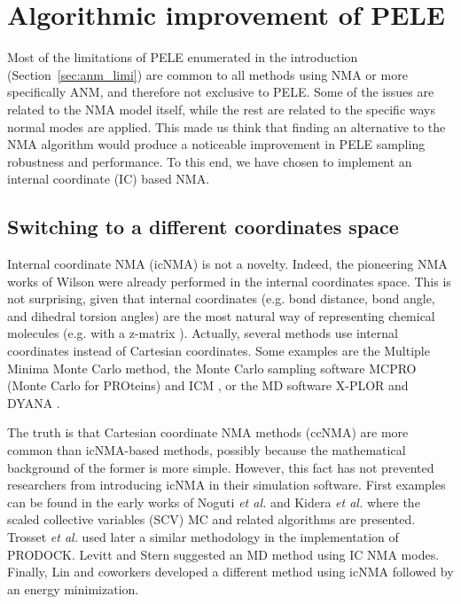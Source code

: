 \section{Algorithmic improvement of PELE}

Most of the limitations of PELE enumerated in the introduction (Section~\ref{sec:anm_limi}) are common to all methods using NMA or more specifically ANM, and therefore not exclusive to PELE. Some of the issues are related to the NMA model itself, while the rest are related to the specific ways normal modes are applied. This made us think that finding an alternative to the NMA algorithm would produce a noticeable improvement in PELE sampling robustness and performance. To this end, we have chosen to implement an internal coordinate (IC) based NMA.

\subsection{Switching to a different coordinates space} 

Internal coordinate NMA (icNMA) is not a novelty. Indeed, the pioneering NMA works of Wilson \cite{wilson_molecular_2012} were already performed in the internal coordinates space. This is not surprising, given that internal coordinates (e.g. bond distance, bond angle, and dihedral torsion angles) are the most natural way of representing chemical molecules (e.g. with a z-matrix \cite{gordon_approximate_1968}). Actually, several methods use internal coordinates instead of Cartesian coordinates. Some examples are the Multiple Minima Monte Carlo \cite{li_monte_1987} method, the Monte Carlo sampling software MCPRO (Monte Carlo for PROteins) \cite{jorgensen_molecular_2005} and ICM \cite{abagyan_icm_1994}, or the MD software X-PLOR \cite{stein_torsion-angle_1997} and DYANA \cite{guntert_torsion_1997}.

The truth is that Cartesian coordinate NMA methods (ccNMA) are more common than icNMA-based methods, possibly because the mathematical background of the former is more simple. However, this fact has not prevented researchers from introducing icNMA in their simulation software. First examples can be found in the early works of Noguti \textit{et al.} \cite{noguti_method_1983, noguti_efficient_1985} and Kidera \textit{et al.} \cite{kidera_enhanced_1995,kidera_smart_1999} where the  scaled collective variables (SCV) MC and related algorithms are presented. Trosset  \textit{et al.} used later a similar methodology \cite{trosset_prodock_1999} in the implementation of PRODOCK. Levitt and Stern \cite{levitt_protein_1985} suggested an MD method using IC NMA modes. Finally, Lin and coworkers \cite{lin_evaluating_2011} developed a different method using icNMA followed by an energy minimization. 

